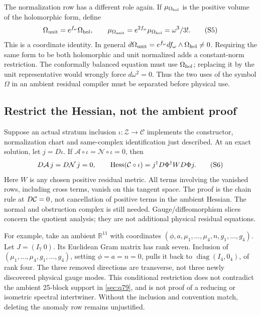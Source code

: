 \documentclass[11pt,a4paper]{article}
\begin{document}
The normalization row has a different role again. If
\(\mu_{\Omega_{\rm hol}}\) is the positive volume of the holomorphic form,
define
\[
 \Omega_{\rm unit}=e^{f_\omega}\Omega_{\rm hol},\qquad
 \mu_{\Omega_{\rm unit}}
 =e^{2f_\omega}\mu_{\Omega_{\rm hol}}=\omega^3/3!.
 \tag{S5}\label{eq:string-unit-volume}
\]
This is a coordinate identity. In general
\(d\Omega_{\rm unit}=e^{f_\omega}df_\omega\wedge\Omega_{\rm hol}\ne0\).
Requiring the same form to be both holomorphic and unit normalized adds
a constant-norm restriction. The conformally balanced equation must use
\(\Omega_{\rm hol}\); replacing it by the unit representative would
wrongly force \(d\omega^2=0\). Thus the two uses of the symbol \(\Omega\)
in an ambient residual compiler must be separated before physical use.

\subsection{Restrict the Hessian, not the ambient proof}
\label{sec:string-constrained-hessian}

Suppose an actual stratum inclusion \(\iota:\mathcal Z\to\mathcal C\)
implements the constructor, normalization chart and same-complex
identification just described. At an exact solution, let \(j=D\iota\).
If \(\mathcal A\circ\iota=\mathcal N\circ\iota=0\), then
\[
 D\mathcal A\,j=D\mathcal N\,j=0,\qquad
 \operatorname{Hess}(\mathcal{C}\circ\iota)
       =j^\dagger D\Phi^\dagger W D\Phi j .
 \tag{S6}\label{eq:string-restricted-gram}
\]
Here \(W\) is any chosen positive residual metric. All terms involving
the vanished rows, including cross terms, vanish on this tangent space.
The proof is the chain rule at \(D\mathcal{C}=0\), not cancellation of positive
terms in the ambient Hessian. The normal and obstruction complex is still
needed. Gauge/diffeomorphism slices concern the quotient analysis; they
are not additional physical residual equations.

For example, take an ambient \(\mathbb R^{11}\) with coordinates
\((\phi,a,\mu_1,\ldots,\mu_4,n,g_1,\ldots,g_4)\). Let
\(J=(I_7\ 0)\). Its Euclidean Gram matrix has rank seven. Inclusion of
\((\mu_1,\ldots,\mu_4,g_1,\ldots,g_4)\), setting \(\phi=a=n=0\),
pulls it back to \(\operatorname{diag}(I_4,0_4)\), of rank four. The three
removed directions are transverse, not three newly discovered physical
gauge modes. This conditional restriction does not contradict the ambient
25-block support in \cref{sec:q79}, and is not proof of a reducing or
isometric spectral intertwiner. Without the inclusion and convention
match, deleting the anomaly row remains unjustified.
\end{document}
